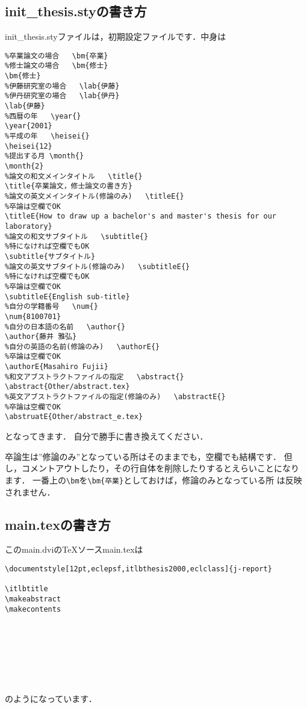 \subsection{init\_thesis.styの書き方}
init\_thesis.styファイルは，初期設定ファイルです．中身は
\begin{verbatim}
%卒業論文の場合   \bm{卒業}
%修士論文の場合   \bm{修士}
\bm{修士}
%伊藤研究室の場合   \lab{伊藤}
%伊丹研究室の場合   \lab{伊丹}
\lab{伊藤}
%西暦の年   \year{}
\year{2001}
%平成の年   \heisei{}
\heisei{12}
%提出する月 \month{}
\month{2}
%論文の和文メインタイトル   \title{}
\title{卒業論文，修士論文の書き方}
%論文の英文メインタイトル(修論のみ)   \titleE{}
%卒論は空欄でOK
\titleE{How to draw up a bachelor's and master's thesis for our laboratory}
%論文の和文サブタイトル   \subtitle{}
%特になければ空欄でもOK 
\subtitle{サブタイトル}
%論文の英文サブタイトル(修論のみ)   \subtitleE{}
%特になければ空欄でもOK
%卒論は空欄でOK
\subtitleE{English sub-title}
%自分の学籍番号   \num{}
\num{8100701}
%自分の日本語の名前   \author{}
\author{藤井 雅弘}
%自分の英語の名前(修論のみ)   \authorE{}
%卒論は空欄でOK
\authorE{Masahiro Fujii}
%和文アブストラクトファイルの指定   \abstract{}
\abstract{Other/abstract.tex}	
%英文アブストラクトファイルの指定(修論のみ)   \abstractE{}
%卒論は空欄でOK
\abstruatE{Other/abstract_e.tex}	
\end{verbatim}
となってきます．
自分で勝手に書き換えてください．

卒論生は''修論のみ''となっている所はそのままでも，空欄でも結構です．
但し，コメントアウトしたり，その行自体を削除したりするとえらいことになり
ます．
一番上の\verb|\bm|を\verb|\bm{卒業}|としておけば，修論のみとなっている所
は反映されません．
\subsection{main.texの書き方}
このmain.dviのTeXソースmain.texは
\begin{verbatim}
\documentstyle[12pt,eclepsf,itlbthesis2000,eclclass]{j-report}

\itlbtitle
\makeabstract
\makecontents








\end{verbatim}
のようになっています．

